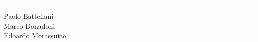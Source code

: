 \documentclass[9pt]{extarticle}
\begin{document}
\begin{multicols*}{3}
\noindent\rule{9cm}{0.3pt}

Paolo Battellani \\
Marco Donadoni \\
Edoardo Morassutto

\end{multicols*}
\end{document}
